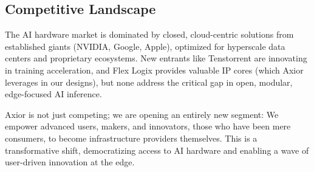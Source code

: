 \documentclass[12pt]{article}
\begin{document}
\begin{multicols}{2}
\columnbreak %

\subsection{Competitive Landscape}
\begin{center}
\end{center}
\vspace{0.5em}
\small The AI hardware market is dominated by closed, cloud-centric solutions from established giants (NVIDIA, Google, Apple), optimized for hyperscale data centers and proprietary ecosystems. New entrants like Tenstorrent are innovating in training acceleration, and Flex Logix provides valuable IP cores (which Axior leverages in our designs), but none address the critical gap in open, modular, edge-focused AI inference.
\vspace{0.3em}

\small Axior is not just competing; we are opening an entirely new segment: We empower advanced users, makers, and innovators, those who have been mere consumers, to become infrastructure providers themselves. This is a transformative shift, democratizing access to AI hardware and enabling a wave of user-driven innovation at the edge.


\end{multicols}
\end{document}
